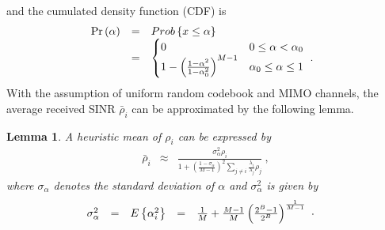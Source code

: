 \documentclass[10pt,fleqn, twocolumn]{IEEEtran}
\newtheorem{lemma}{Lemma}
\begin{document}
\noindent and the cumulated density function (CDF) is
\begin{equation}\hspace{-0.10in}
\begin{array}{rcl}
{\rm Pr}\left(\alpha\right)&=&\mbox{Prob}\left\{x\leq\alpha\right\} \\
&=&
\begin{cases}
0 & 0 \leq\alpha < \alpha_{0} \\
1-\left(\frac{1-\alpha^2}{1-\alpha_{0}^2}\right)^{M-1} &
\alpha_{0}\leq\alpha\leq 1
\end{cases}\ .
\end{array}
\end{equation}
\noindent With the assumption of uniform random codebook and MIMO
channels, the average received SINR $\bar\rho_{i}$ can be
approximated by the following lemma.
\begin{lemma} A heuristic mean of $\rho_{i}$
can be expressed by
\begin{equation}%
\begin{array}{rcl}
\bar\rho_{i}&\approx&\frac{\sigma_{\alpha}^{2}\rho_{i}}{1+
\left(\frac{1-\sigma_{\alpha}}{M-1}\right)^{2}\sum\limits_{j\neq
i}\frac{\lambda_{i}}{\lambda_{j}}\rho_{j}}\ ,
\end{array}
\end{equation}
\noindent where $\sigma_{\alpha}$ denotes the standard deviation
of $\alpha$ and $\sigma_{\alpha}^2$ is given by
\begin{equation}\hspace{-0.2in}
\begin{array}{rcccl}
\sigma_{\alpha}^2&=&\mbox{E}\left\{\alpha_{i}^2\right\}&=&\frac{1}{M}+\frac{M-1}{M}\left(\frac{2^B-1}{2^B}\right)^{\frac{1}{M-1}}
\end{array}.\label{sigma_alpha}
\end{equation}
\end{lemma}
\end{document}
